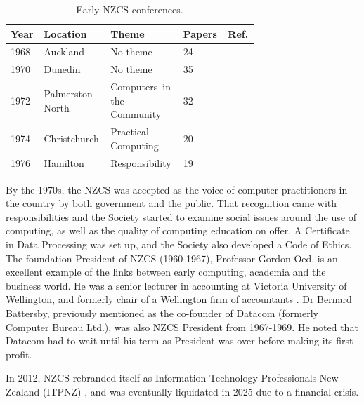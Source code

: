 \documentclass{IEEEcsmag}
\begin{document}
\begin{table}[h]
\begin{center}
\begin{tabular}{|p{0.07\linewidth}|p{0.20\linewidth}|p{0.26\linewidth}|p{0.12\linewidth}|p{0.05\linewidth}<{\raggedright\arraybackslash}|} 
 \hline
 Year & Location & Theme  & Papers & Ref.\\ 
\hline
1968 & Auckland & No theme & 24 & \cite{NZCS-1}\\\hline
1970 & Dunedin& No theme &  35 & \cite{NZCS-2}\\\hline
1972 & Palmerston North & Computers~in the Community &  32 & \cite{NZCS-3}\\\hline
1974 & Christchurch & Practical Computing &  20 & \cite{NZCS-4}\\\hline
1976 & Hamilton & Responsibility &  19 & \cite{NZCS-5}\\\hline
\end{tabular}
\vspace{1ex}
\caption{\label{NZCSconf}Early NZCS conferences.}
\end{center}
\end{table}
By the 1970s, the NZCS was accepted as the voice of computer practitioners in the country by both government and the public.  That recognition came with responsibilities and the Society started to examine social issues around the use of computing, as well as the quality of computing education on offer.  A Certificate in Data Processing was set up, and the Society also developed a Code of Ethics.
The foundation President of NZCS (1960-1967), Professor Gordon Oed,  is an excellent example of the links between early computing, academia and the business world. He was a senior lecturer in accounting at Victoria University of Wellington, and formerly chair of a Wellington firm of accountants \cite{Toland-2022}. Dr Bernard Battersby, previously mentioned as the co-founder of Datacom (formerly Computer Bureau Ltd.), was also NZCS President from 1967-1969. He noted that Datacom had to wait until his term as President was over before making its first profit.

In 2012, NZCS rebranded itself as Information Technology Professionals New Zealand (ITPNZ) \cite{Matthews},
and was eventually liquidated in 2025 due to a financial crisis.
\end{document}
